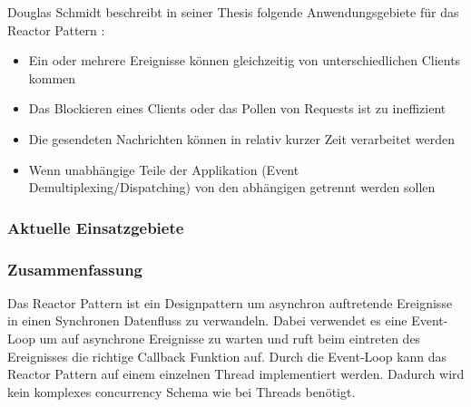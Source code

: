 Douglas Schmidt beschreibt in seiner Thesis folgende Anwendungsgebiete für das Reactor Pattern \cite[p. 4]{Sch95}:

\begin{itemize}
  \item Ein oder mehrere Ereignisse können gleichzeitig von unterschiedlichen Clients kommen
  \item Das Blockieren eines Clients oder das Pollen von Requests ist zu ineffizient
  \item Die gesendeten Nachrichten können in relativ kurzer Zeit verarbeitet werden
  \item Wenn unabhängige Teile der Applikation (Event Demultiplexing/Dispatching) von den abhängigen getrennt werden sollen
\end{itemize}


\subsubsection{Aktuelle Einsatzgebiete}


\subsubsection{Zusammenfassung}

Das Reactor Pattern ist ein Designpattern um asynchron auftretende Ereignisse in einen Synchronen Datenfluss zu verwandeln. Dabei verwendet es eine Event-Loop um auf asynchrone Ereignisse zu warten und ruft beim eintreten des Ereignisses die richtige Callback Funktion auf. Durch die Event-Loop kann das Reactor Pattern auf einem einzelnen Thread implementiert werden. Dadurch wird kein komplexes concurrency Schema wie bei Threads benötigt.